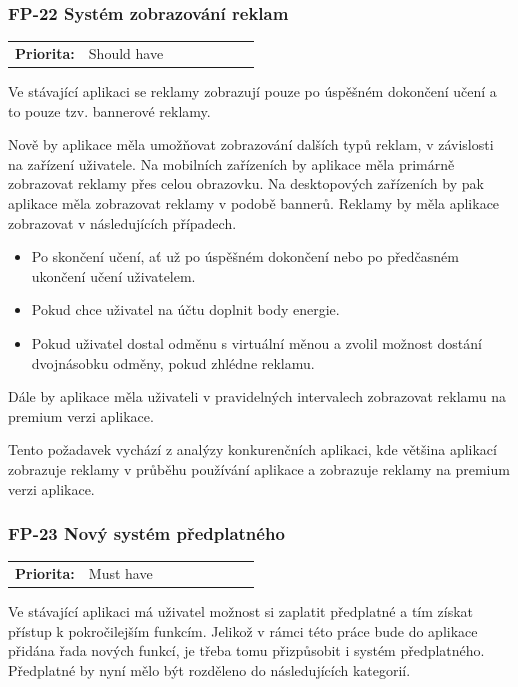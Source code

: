 \subsubsection{FP-22 Systém zobrazování reklam}

\begin{tabular}{lp{0.7\linewidth}}
    \textbf{Priorita:} & Should have \\
\end{tabular}

Ve stávající aplikaci se reklamy zobrazují pouze po úspěšném dokončení učení a to pouze tzv. bannerové reklamy. %

Nově by aplikace měla umožňovat zobrazování dalších typů reklam, v závislosti na zařízení uživatele. Na mobilních zařízeních by aplikace měla primárně zobrazovat reklamy přes celou obrazovku. Na desktopových zařízeních by pak aplikace měla zobrazovat reklamy v podobě bannerů. Reklamy by měla aplikace zobrazovat v následujících případech.

\begin{itemize}
    \item Po skončení učení, ať už po úspěšném dokončení nebo po předčasném ukončení učení uživatelem.
    \item Pokud chce uživatel na účtu doplnit body energie.
    \item Pokud uživatel dostal odměnu s virtuální měnou a zvolil možnost dostání dvojnásobku odměny, pokud zhlédne reklamu.
\end{itemize}

Dále by aplikace měla uživateli v pravidelných intervalech zobrazovat reklamu na premium verzi aplikace.

Tento požadavek vychází z analýzy konkurenčních aplikaci, kde většina aplikací zobrazuje reklamy v průběhu používání aplikace a zobrazuje reklamy na premium verzi aplikace.

\subsubsection{FP-23 Nový systém předplatného}

\begin{tabular}{lp{0.7\linewidth}}
    \textbf{Priorita:} & Must have \\
\end{tabular}

Ve stávající aplikaci má uživatel možnost si zaplatit předplatné a tím získat přístup k pokročilejším funkcím. Jelikož v rámci této práce bude do aplikace přidána řada nových funkcí, je třeba tomu přizpůsobit i systém předplatného. Předplatné by nyní mělo být rozděleno do následujících kategorií.

